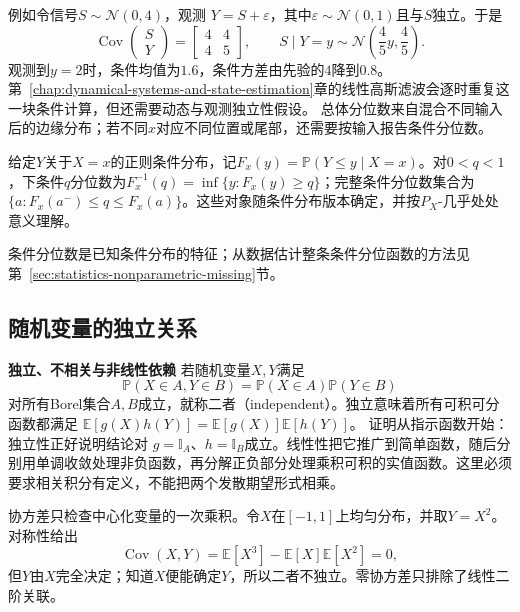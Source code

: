 例如令信号\(S\sim\mathcal{N}(0,4)\)，观测
\(Y=S+\varepsilon\)，其中\(\varepsilon\sim\mathcal{N}(0,1)\)且与\(S\)独立。于是
\[
  \operatorname{Cov}
  \begin{pmatrix}S\\Y\end{pmatrix}
  =
  \begin{bmatrix}4&4\\4&5\end{bmatrix},
  \qquad
  S\mid Y=y\sim\mathcal{N}\left(\frac45y,\frac45\right).
\]
观测到\(y=2\)时，条件均值为\(1.6\)，条件方差由先验的\(4\)降到\(0.8\)。第~\ref{chap:dynamical-systems-and-state-estimation}章的线性高斯滤波会逐时重复这一块条件计算，但还需要动态与观测独立性假设。
总体分位数来自混合不同输入后的边缘分布；若不同\(x\)对应不同位置或尾部，还需要按输入报告条件分位数。
\begin{definition}[条件分位数]
  \label{def:statistics-conditional-quantile}
给定\(Y\)关于\(X=x\)的正则条件分布，记\(F_x(y)=\mathbb P(Y\leq y\mid X=x)\)。对\(0<q<1\)，下条件\(q\)分位数为\(F_x^{-1}(q)=\inf\{y:F_x(y)\geq q\}\)；完整条件分位数集合为\(\{a:F_x(a^-)\leq q\leq F_x(a)\}\)。这些对象随条件分布版本确定，并按\(P_X\)-几乎处处意义理解。
\end{definition}
条件分位数是已知条件分布的特征；从数据估计整条条件分位函数的方法见第~\ref{sec:statistics-nonparametric-missing}节。

\subsection{随机变量的独立关系}
\label{sec:probability-moments-independence}

\par\medskip\noindent\textbf{独立、不相关与非线性依赖}\quad
若随机变量\(X,Y\)满足
\[ \mathbb{P}(X\in A,Y\in B)
  =\mathbb{P}(X\in A)\mathbb{P}(Y\in B) \]
对所有Borel集合\(A,B\)成立，就称二者（independent）。独立意味着所有可积可分函数都满足
\(\mathbb{E}[g(X)h(Y)]=\mathbb{E}[g(X)]\mathbb{E}[h(Y)]\)。
证明从指示函数开始：独立性正好说明结论对
\(g=\mathbb{I}_A\)、\(h=\mathbb{I}_B\)成立。线性性把它推广到简单函数，随后分别用单调收敛处理非负函数，再分解正负部分处理乘积可积的实值函数。这里必须要求相关积分有定义，不能把两个发散期望形式相乘。

协方差只检查中心化变量的一次乘积。令\(X\)在\([-1,1]\)上均匀分布，并取\(Y=X^2\)。对称性给出
\[ \operatorname{Cov}(X,Y)
  =\mathbb{E}[X^3]-\mathbb{E}[X]\mathbb{E}[X^2]=0, \]
但\(Y\)由\(X\)完全决定；知道\(X\)便能确定\(Y\)，所以二者不独立。零协方差只排除了线性二阶关联。

